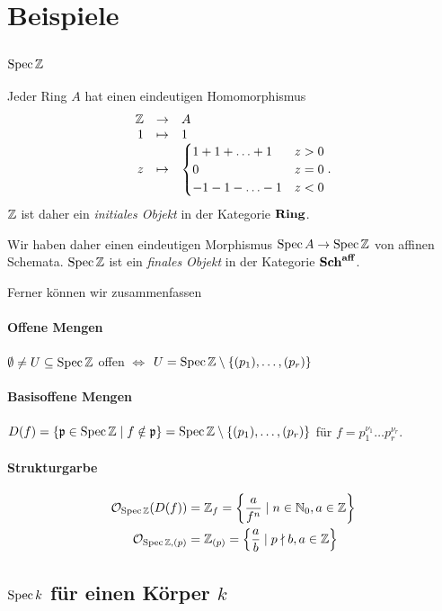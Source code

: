 \section{Beispiele}

\subsection{$\operatorname{Spec} \mathbb{Z}$}

Jeder Ring $A$ hat einen eindeutigen Homomorphismus
\[
	\funcdef{
		\Z & \to & A\\
		 1 & \mapsto & 1\\
		 z & \mapsto & \begin{cases} 1 + 1 + \ldots + 1 & z > 0\\
		 	0 & z = 0\\
		 	-1 -1 - \ldots- 1 & z < 0
		 \end{cases}.}
\]
$\mathbb{Z}$ ist daher ein \emph{initiales Objekt} in der Kategorie $\mathbf{Ring}$.

Wir haben daher einen eindeutigen Morphismus $\operatorname{Spec} A \to \operatorname{Spec} \mathbb{Z}$ von
affinen Schemata. $\operatorname{Spec} \mathbb{Z}$ ist ein \emph{finales Objekt} in
der Kategorie $\mathbf{Sch}^{\mathbf{aff}}$.

Ferner können wir zusammenfassen
\paragraph{Offene Mengen}
	$\emptyset \neq U\subseteq \operatorname{Spec} \mathbb{Z}$ offen 
	$\Leftrightarrow$ $U = \operatorname{Spec} \mathbb{Z} \setminus \{(p_1),\ldots,(p_r)\}$
	
\paragraph{Basisoffene Mengen}
	$D(f) = \{\mathfrak{p} \in \operatorname{Spec}\mathbb{Z} \mid f \notin \mathfrak{p}\} = 
	\operatorname{Spec}\mathbb{Z} \setminus \{(p_1),\ldots,(p_r)\}$ für 
	$f = p_1^{\nu_1}\ldots p_r^{\nu_r}$.
	
\paragraph{Strukturgarbe}
	\begin{align*}
		\mathcal{O}_{\operatorname{Spec}\mathbb{Z}} (D(f)) &= \mathbb{Z}_f  = 
			\left\{ \frac{a}{f^n} \mid n\in \mathbb{N}_0, a\in \mathbb{Z}\right\} \\
		\mathcal{O}_{\operatorname{Spec}\mathbb{Z}, (p)} &= \mathbb{Z}_{(p)} = 
			\left\{ \frac{a}{b} \mid p\nmid b, a\in \mathbb{Z}\right\} 
 	\end{align*}

\subsection{$\operatorname{Spec} k$ für einen Körper $k$}

\pagebreak

